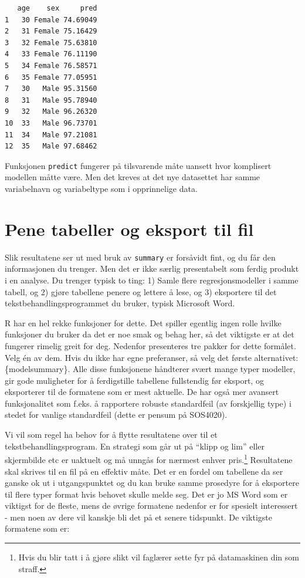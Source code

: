 \documentclass[
  norsk,
  letterpaper,
  DIV=11,
  numbers=noendperiod]{scrreprt}
\theoremstyle{definition}
\theoremstyle{remark}
\begin{document}
\begin{verbatim}
   age    sex     pred
1   30 Female 74.69049
2   31 Female 75.16429
3   32 Female 75.63810
4   33 Female 76.11190
5   34 Female 76.58571
6   35 Female 77.05951
7   30   Male 95.31560
8   31   Male 95.78940
9   32   Male 96.26320
10  33   Male 96.73701
11  34   Male 97.21081
12  35   Male 97.68462
\end{verbatim}

Funksjonen \texttt{predict} fungerer på tilsvarende måte uansett hvor
komplisert modellen måtte være. Men det kreves at det nye datasettet har
samme variabelnavn og variabeltype som i opprinnelige data.

\section{Pene tabeller og eksport til
fil}\label{pene-tabeller-og-eksport-til-fil}

Slik resultatene ser ut med bruk av \texttt{summary} er forsåvidt fint,
og du får den informasjonen du trenger. Men det er ikke særlig
presentabelt som ferdig produkt i en analyse. Du trenger typisk to ting:
1) Samle flere regresjonsmodeller i samme tabell, og 2) gjøre tabellene
penere og lettere å lese, og 3) eksportere til det
tekstbehandlingsprogrammet du bruker, typisk Microsoft Word.

R har en hel rekke funksjoner for dette. Det spiller egentlig ingen
rolle hvilke funksjoner du bruker da det er noe smak og behag her, så
det viktigste er at det fungerer rimelig greit for deg. Nedenfor
presenteres tre pakker for dette formålet. Velg én av dem. Hvis du ikke
har egne preferanser, så velg det første alternativet: \{modelsummary\}.
Alle disse funksjonene håndterer svært mange typer modeller, gir gode
muligheter for å ferdigstille tabellene fullstendig før eksport, og
eksporterer til de formatene som er mest aktuelle. De har også mer
avansert funksjonalitet som f.eks. å rapportere robuste standardfeil (av
forskjellig type) i stedet for vanlige standardfeil (dette er pensum på
SOS4020).

Vi vil som regel ha behov for å flytte resultatene over til et
tekstbehandlingsprogram. En strategi som går ut på ``klipp og lim''
eller skjermbilde etc er uaktuelt og må unngås for nærmest enhver
pris.\footnote{Hvis du blir tatt i å gjøre slikt vil faglærer sette fyr
  på datamaskinen din som straff.} Resultatene skal skrives til en fil
på en effektiv måte. Det er en fordel om tabellene da ser ganske ok ut i
utgangspunktet og du kan bruke samme prosedyre for å eksportere til
flere typer format hvis behovet skulle melde seg. Det er jo MS Word som
er viktigst for de fleste, mens de øvrige formatene nedenfor er for
spesielt interessert - men noen av dere vil kanskje bli det på et senere
tidspunkt. De viktigste formatene som er:
\end{document}
